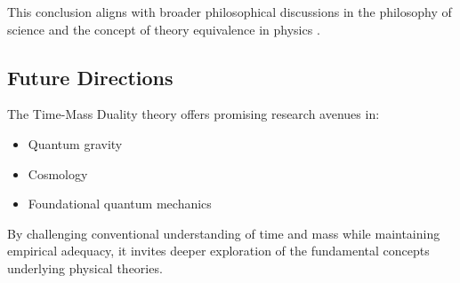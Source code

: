 \documentclass[a4paper,12pt]{article}
\begin{document}
	This conclusion aligns with broader philosophical discussions in the philosophy of science \cite{Kuhn1962} and the concept of theory equivalence in physics \cite{Weatherall2019}.
	
	\subsection{Future Directions}
	The Time-Mass Duality theory offers promising research avenues in:
	
	\begin{itemize}[leftmargin=*,nosep]
		\item Quantum gravity
		\item Cosmology
		\item Foundational quantum mechanics
	\end{itemize}
	
	By challenging conventional understanding of time and mass while maintaining empirical adequacy, it invites deeper exploration of the fundamental concepts underlying physical theories.
	
\end{document}
